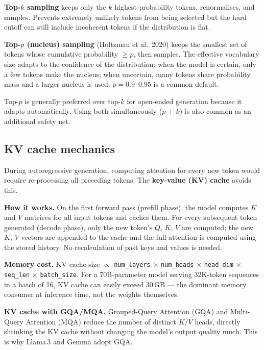 \textbf{Top-$k$ sampling} keeps only the $k$ highest-probability tokens, renormalises,
and samples. Prevents extremely unlikely tokens from being selected but the hard cutoff
can still include incoherent tokens if the distribution is flat.

\textbf{Top-$p$ (nucleus) sampling} (Holtzman et al.\ 2020) keeps the smallest set of
tokens whose cumulative probability $\geq p$, then samples. The effective vocabulary size
adapts to the confidence of the distribution: when the model is certain, only a few tokens
make the nucleus; when uncertain, many tokens share probability mass and a larger nucleus
is used. $p = 0.9$--$0.95$ is a common default.

\begin{notebox}
  Top-$p$ is generally preferred over top-$k$ for open-ended generation because it
  adapts automatically. Using both simultaneously ($p$ + $k$) is also common as an
  additional safety net.
\end{notebox}

\subsection{KV cache mechanics}

During autoregressive generation, computing attention for every new token would require
re-processing all preceding tokens. The \textbf{key-value (KV) cache} avoids this.

\textbf{How it works.} On the first forward pass (prefill phase), the model computes
$K$ and $V$ matrices for all input tokens and caches them. For every subsequent token
generated (decode phase), only the new token's $Q$, $K$, $V$ are computed; the new
$K$, $V$ vectors are appended to the cache and the full attention is computed using the
stored history. No recalculation of past keys and values is needed.

\textbf{Memory cost.} KV cache size $\propto$ \texttt{num\_layers} $\times$
\texttt{num\_heads} $\times$ \texttt{head\_dim} $\times$ \texttt{seq\_len} $\times$
\texttt{batch\_size}. For a 70B-parameter model serving 32K-token sequences in a batch
of 16, KV cache can easily exceed 30\,GB --- the dominant memory consumer at inference
time, not the weights themselves.

\textbf{KV cache with GQA/MQA.} Grouped-Query Attention (GQA) and Multi-Query Attention
(MQA) reduce the number of distinct $K$/$V$ heads, directly shrinking the KV cache
without changing the model's output quality much. This is why Llama\,3 and Gemma adopt GQA.

